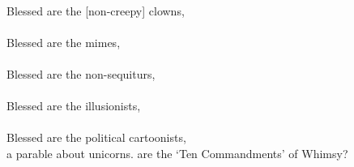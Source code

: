 \\
\bverse Blessed are the [non-creepy] clowns, \\
\\
\bverse Blessed are the mimes, \\
\\
\bverse Blessed are the non-sequiturs, \\
\\
\bverse Blessed are the illusionists, \\
\\
\bverse Blessed are the political cartoonists, \\
\clearpage
\clearpage
\bversenonum {} a parable about unicorns.
\clearpage
\clearpage
\bversenonum {} are the `Ten Commandments' of Whimsy?
\clearpage
\clearpage
